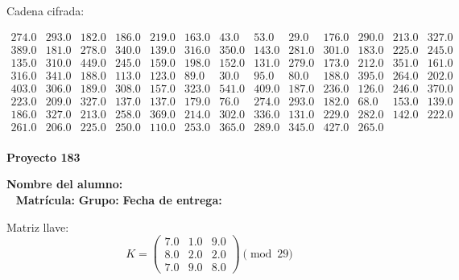 \documentclass[12pt]{article}
\begin{document}
Cadena cifrada:
\begin{center}
$\begin{array}{lllllllllllll}
274.0 & 293.0 & 182.0 & 186.0 & 219.0 & 163.0 & 43.0 & 53.0 & 29.0 & 176.0 & 290.0 & 213.0 & 327.0\\
389.0 & 181.0 & 278.0 & 340.0 & 139.0 & 316.0 & 350.0 & 143.0 & 281.0 & 301.0 & 183.0 & 225.0 & 245.0\\
135.0 & 310.0 & 449.0 & 245.0 & 159.0 & 198.0 & 152.0 & 131.0 & 279.0 & 173.0 & 212.0 & 351.0 & 161.0\\
316.0 & 341.0 & 188.0 & 113.0 & 123.0 & 89.0 & 30.0 & 95.0 & 80.0 & 188.0 & 395.0 & 264.0 & 202.0\\
403.0 & 306.0 & 189.0 & 308.0 & 157.0 & 323.0 & 541.0 & 409.0 & 187.0 & 236.0 & 126.0 & 246.0 & 370.0\\
223.0 & 209.0 & 327.0 & 137.0 & 137.0 & 179.0 & 76.0 & 274.0 & 293.0 & 182.0 & 68.0 & 153.0 & 139.0\\
186.0 & 327.0 & 213.0 & 258.0 & 369.0 & 214.0 & 302.0 & 336.0 & 131.0 & 229.0 & 282.0 & 142.0 & 222.0\\
261.0 & 206.0 & 225.0 & 250.0 & 110.0 & 253.0 & 365.0 & 289.0 & 345.0 & 427.0 & 265.0\\
\end{array}$
\end{center}

\newpage


\textbf{Proyecto 183}

\textbf{Nombre del alumno:} \underline{\hspace{13cm}}\\\
\vspace{1cm}
\textbf{Matrícula:} \underline{\hspace{4cm}} \hspace{1cm}
\textbf{Grupo:} \underline{\hspace{2cm}}
\textbf{Fecha de entrega:} \underline{\hspace{2cm}}

\medskip

Matriz llave:
\[
K = \begin{pmatrix}
7.0 & 1.0 & 9.0\\
8.0 & 2.0 & 2.0\\
7.0 & 9.0 & 8.0
\end{pmatrix} \pmod{29}
\]
\end{document}
